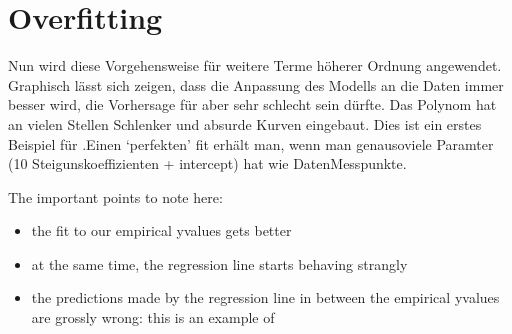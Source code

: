 \documentclass[letterpaper,10pt,english]{jupyterBook}
\begin{document}
\section{Overfitting}
\label{\detokenize{Regression_Techniques:overfitting}}
\sphinxAtStartPar
Nun wird diese Vorgehensweise für weitere Terme höherer Ordnung angewendet. Graphisch lässt sich zeigen, dass die Anpassung des Modells an die Daten immer besser wird, die Vorhersage für  aber sehr schlecht sein dürfte. Das Polynom hat an vielen Stellen Schlenker und absurde Kurven eingebaut. Dies ist ein erstes Beispiel für .Einen ‘perfekten’ fit erhält man, wenn man genausoviele Paramter (10 Steigunskoeffizienten + intercept) hat wie Daten\sphinxhyphen{}Messpunkte.

\sphinxAtStartPar
The important points to note here:
\begin{itemize}
\item {} 
\sphinxAtStartPar
the fit to our empirical y\sphinxhyphen{}values gets better

\item {} 
\sphinxAtStartPar
at the same time, the regression line starts behaving strangly

\item {} 
\sphinxAtStartPar
the predictions made by the regression line in between the empirical y\sphinxhyphen{}values are grossly wrong: this is an example of 

\end{itemize}
\end{document}
